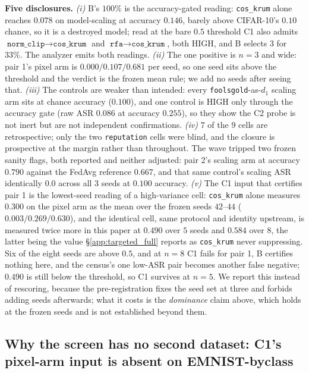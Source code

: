 \documentclass{article}
\begin{document}
\noindent \textbf{Five disclosures.} \emph{(i)} B's $100\%$ is the accuracy-gated reading: \texttt{cos\_krum} alone reaches $0.078$ on model-scaling at accuracy $0.146$, barely above CIFAR-10's $0.10$ chance, so it is a destroyed model; read at the bare $0.5$ threshold C1 also admits $\texttt{norm\_clip}\to\texttt{cos\_krum}$ and $\texttt{rfa}\to\texttt{cos\_krum}$, both HIGH, and B selects $3$ for $33\%$. The analyzer emits both readings. \emph{(ii)} The one positive is $n{=}3$ and wide: pair 1's pixel arm is $0.000/0.107/0.681$ per seed, so one seed sits above the threshold and the verdict is the frozen mean rule; we add no seeds after seeing that. \emph{(iii)} The controls are weaker than intended: every \texttt{foolsgold}-as-$d_1$ scaling arm sits at chance accuracy ($0.100$), and one control is HIGH only through the accuracy gate (raw ASR $0.086$ at accuracy $0.255$), so they show the C2 probe is not inert but are not independent confirmations. \emph{(iv)} $7$ of the $9$ cells are retrospective; only the two \texttt{reputation} cells were blind, and the closure is prospective at the margin rather than throughout. The wave tripped two frozen sanity flags, both reported and neither adjusted: pair 2's scaling arm at accuracy $0.790$ against the FedAvg reference $0.667$, and that same control's scaling ASR identically $0.0$ across all $3$ seeds at $0.100$ accuracy. \emph{(v)} The C1 input that certifies pair 1 is the lowest-seed reading of a high-variance cell: \texttt{cos\_krum} alone measures $0.300$ on the pixel arm as the mean over the frozen seeds $42$--$44$ ($0.003/0.269/0.630$), and the identical cell, same protocol and identity upstream, is measured twice more in this paper at $0.490$ over $5$ seeds and $0.584$ over $8$, the latter being the value \S\ref{app:targeted_full} reports as \texttt{cos\_krum} never suppressing. Six of the eight seeds are above $0.5$, and at $n{=}8$ C1 fails for pair 1, B certifies nothing here, and the census's one low-ASR pair becomes another false negative; $0.490$ is still below the threshold, so C1 survives at $n{=}5$. We report this instead of rescoring, because the pre-registration fixes the seed set at three and forbids adding seeds afterwards; what it costs is the \emph{dominance} claim above, which holds at the frozen seeds and is not established beyond them.

\subsection{Why the screen has no second dataset: C1's pixel-arm input is absent on EMNIST-byclass}
\label{app:femnist_c1}
\end{document}

